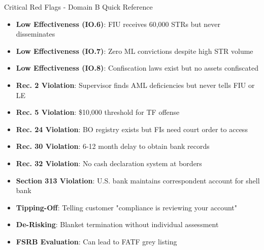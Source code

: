 \documentclass{beamer}
\begin{document}
	\begin{frame}{Critical Red Flags - Domain B Quick Reference}
		\begin{itemize}
			\item \textbf{Low Effectiveness (IO.6)}: FIU receives 60,000 STRs but never disseminates
			\item \textbf{Low Effectiveness (IO.7)}: Zero ML convictions despite high STR volume
			\item \textbf{Low Effectiveness (IO.8)}: Confiscation laws exist but no assets confiscated
			\item \textbf{Rec. 2 Violation}: Supervisor finds AML deficiencies but never tells FIU or LE
			\item \textbf{Rec. 5 Violation}: \$10,000 threshold for TF offense
			\item \textbf{Rec. 24 Violation}: BO registry exists but FIs need court order to access
			\item \textbf{Rec. 30 Violation}: 6-12 month delay to obtain bank records
			\item \textbf{Rec. 32 Violation}: No cash declaration system at borders
			\item \textbf{Section 313 Violation}: U.S. bank maintains correspondent account for shell bank
			\item \textbf{Tipping-Off}: Telling customer "compliance is reviewing your account"
			\item \textbf{De-Risking}: Blanket termination without individual assessment
			\item \textbf{FSRB Evaluation}: Can lead to FATF grey listing
		\end{itemize}
	\end{frame}
	
\end{document}
